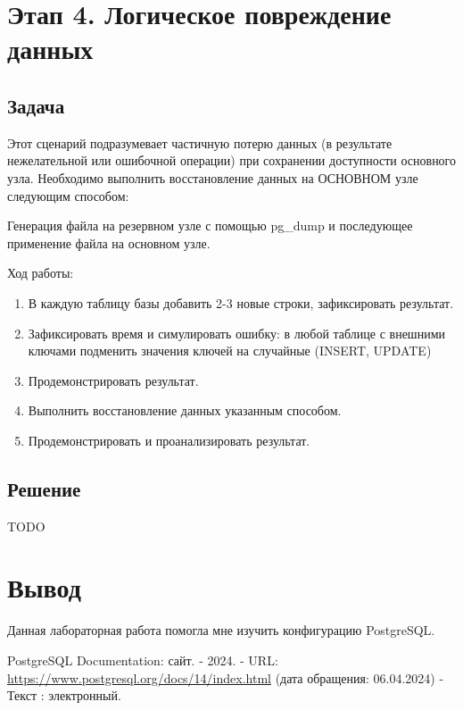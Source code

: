 \documentclass{article}
\begin{document}
\section{Этап 4. Логическое повреждение данных}

\subsection{Задача}

Этот сценарий подразумевает частичную потерю данных (в результате нежелательной или ошибочной операции) при сохранении доступности основного узла. Необходимо выполнить восстановление данных на ОСНОВНОМ узле следующим способом:

Генерация файла на резервном узле с помощью pg\_dump и последующее применение файла на основном узле.

Ход работы:

\begin{enumerate}
    \item В каждую таблицу базы добавить 2-3 новые строки, зафиксировать результат.
    \item Зафиксировать время и симулировать ошибку: в любой таблице с внешними ключами подменить значения ключей на случайные (INSERT, UPDATE)
    \item Продемонстрировать результат.
    \item Выполнить восстановление данных указанным способом.
    \item Продемонстрировать и проанализировать результат.
\end{enumerate}

\subsection{Решение}

TODO

\section{Вывод}

Данная лабораторная работа помогла мне изучить конфигурацию PostgreSQL.

\begin{thebibliography}{99}
        PostgreSQL Documentation: сайт. - 2024. 
        - URL: \url{https://www.postgresql.org/docs/14/index.html} (дата обращения: 06.04.2024) - Текст : электронный.
\end{thebibliography}
\end{document}
